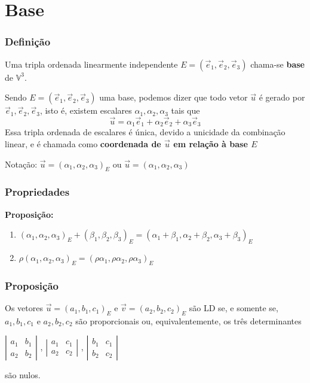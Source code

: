 \documentclass[hyperref={pdfpagelabels=false}]{beamer}
\begin{document}
\section{Base}

\begin{frame}
\frametitle{Definição}

Uma tripla ordenada linearmente independente $E = (\overrightarrow{e}_1,\overrightarrow{e}_2,\overrightarrow{e}_3)$ chama-se {\bf base} de $\mathbb{V}^3$.

\pause

Sendo $E = (\overrightarrow{e}_1,\overrightarrow{e}_2,\overrightarrow{e}_3)$ uma base, podemos dizer que todo vetor $\overrightarrow{u}$ é gerado por $\overrightarrow{e}_1,\overrightarrow{e}_2,\overrightarrow{e}_3$, isto é, existem escalares $\alpha_1,\alpha_2,\alpha_3$ tais que
$$\overrightarrow{u} = \alpha_1\overrightarrow{e}_1 + \alpha_2\overrightarrow{e}_2 + \alpha_3\overrightarrow{e}_3$$
Essa tripla ordenada de escalares é única, devido a unicidade da combinação linear, e é chamada como {\bf coordenada de $\overrightarrow{u}$ em relação à base $E$}

Notação: $\overrightarrow{u} = (\alpha_1,\alpha_2,\alpha_3)_E$ ou $\overrightarrow{u} = (\alpha_1,\alpha_2,\alpha_3)$

\end{frame}

\begin{frame}
\frametitle{Propriedades}

{\bf Proposição: } \begin{enumerate}
	\item $ (\alpha_1,\alpha_2,\alpha_3)_E + (\beta_1,\beta_2,\beta_3)_E = (\alpha_1 + \beta_1, \alpha_2 + \beta_2, \alpha_3 + \beta_3)_E$
	\item $\rho(\alpha_1,\alpha_2,\alpha_3)_E = (\rho\alpha_1,\rho\alpha_2,\rho\alpha_3)_E$
\end{enumerate}

\end{frame}

\begin{frame}
\frametitle{Proposição}

Os vetores $\overrightarrow{u} = (a_1,b_1,c_1)_E$ e $\overrightarrow{v} = (a_2,b_2,c_2)_E$ são LD se, e somente se, $a_1,b_1,c_1$ e $a_2,b_2,c_2$ são proporcionais ou, equivalentemente, os três determinantes
\begin{center}
	$\left|
	\begin{array}{cc}
	a_1	&	b_1	\\
	a_2	&	b_2
	\end{array}
	\right|
	$
	,
	$\left|
	\begin{array}{cc}
	a_1	&	c_1	\\
	a_2	&	c_2
	\end{array}
	\right|
	$
	,
	$\left|
	\begin{array}{cc}
	b_1	&	c_1	\\
	b_2	&	c_2
	\end{array}
	\right|
	$
\end{center}
são nulos.
\end{frame}
\end{document}
